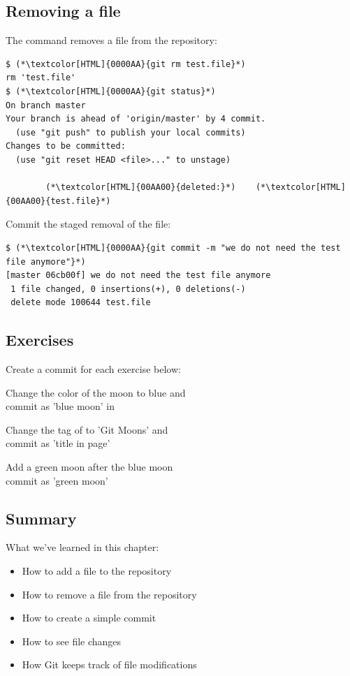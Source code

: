 \subsection{Removing a file}
\begin{frame}[fragile]
\subslidetitle
  The command  removes a file from the repository:
\begin{lstlisting}
$ (*\textcolor[HTML]{0000AA}{git rm test.file}*)
rm 'test.file'
$ (*\textcolor[HTML]{0000AA}{git status}*)
On branch master
Your branch is ahead of 'origin/master' by 4 commit.
  (use "git push" to publish your local commits)
Changes to be committed:
  (use "git reset HEAD <file>..." to unstage)

        (*\textcolor[HTML]{00AA00}{deleted:}*)    (*\textcolor[HTML]{00AA00}{test.file}*)
\end{lstlisting}

  Commit the staged removal of the file:
  \begin{lstlisting}
$ (*\textcolor[HTML]{0000AA}{git commit -m "we do not need the test file anymore"}*)
[master 06cb00f] we do not need the test file anymore
 1 file changed, 0 insertions(+), 0 deletions(-)
 delete mode 100644 test.file
\end{lstlisting}

\end{frame}

\subsection{Exercises}
\begin{frame}[fragile]
\subslidetitle
  Create a commit for each exercise below:
  \begin{exercise}
    \item Change the color of the moon to blue and\\
      commit as 'blue moon' in 
    \item Change the  tag of  to 'Git Moons' and\\
      commit as 'title in page'
    \item Add a green moon after the blue moon\\
      commit as 'green moon'
  \end{exercise}

\end{frame}

\subsection{Summary}
\begin{frame}[fragile]
\subslidetitle
  What we've learned in this chapter:
  \begin{itemize}
    \item How to add a file to the repository
    \item How to remove a file from the repository
    \item How to create a simple commit
    \item How to see file changes
    \item How Git keeps track of file modifications
  \end{itemize}
\end{frame}
